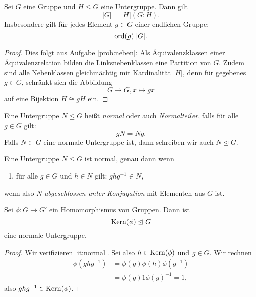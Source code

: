 \documentclass{book}
\begin{document}
\begin{cor}
    \label{cor:lagrange} Sei $G$ eine Gruppe und $H \le G$ eine Untergruppe. Dann gilt
    \[
        |G| = |H| (G:H).
    \]
    Insbesondere gilt für jedes Element $g \in G$ einer endlichen Gruppe: 
    \[
        \operatorname{ord}(g) | |G|.
    \]
\end{cor}
\begin{proof}
    Dies folgt aus Aufgabe \ref{prob:neben}: Als Äquivalenzklassen einer
    Äquivalenzrelation bilden die Linksnebenklassen eine Partition von $G$.
    Zudem sind alle Nebenklassen gleichmächtig mit Kardinalität $|H|$, denn für
    gegebenes $g \in G$, schränkt sich die Abbildung
    \[
        G \to G, x \mapsto gx
    \]
    auf eine Bijektion $H \cong gH$ ein. 
\end{proof}

\begin{defi}
    \label{defi:normal}
    Eine Untergruppe $N \le G$ heißt \emph{normal} oder auch \emph{Normalteiler}, falls für alle $g \in G$ gilt:
    \[
        gN = Ng.
    \]
    Falls $N \subset G$ eine normale Untergruppe ist, dann schreiben wir auch $N \trianglelefteq G$. 
\end{defi}

\begin{rem}
    \label{rem:normal}
    Eine Untergruppe $N \le G$ ist normal, genau dann wenn
    \begin{enumerate}[label=(N\arabic*),leftmargin=1.2cm]
        \item\label{it:normal} für alle $g \in G$ und $h \in N$ gilt: $ghg^{-1} \in N$, 
    \end{enumerate}
    wenn also $N$ \emph{abgeschlossen unter Konjugation} mit Elementen aus $G$ ist.  
\end{rem}

\begin{prop}
    \label{prop:kernnormal}
    Sei $\phi: G \to G'$ ein Homomorphismus von Gruppen. Dann ist 
    \[
        \Kern(\phi) \no G
    \]
    eine normale Untergruppe. 
\end{prop}
\begin{proof}
    Wir verifizieren \ref{it:normal}. Sei also $h \in \Kern(\phi)$ und $g \in G$. Wir rechnen
    \begin{align*}
        \phi(g h g^{-1}) & = \phi(g) \phi(h) \phi(g^{-1})\\
                         & = \phi(g) 1 \phi(g)^{-1} = 1,
    \end{align*}
    also $g h g^{-1} \in \Kern(\phi)$. 
\end{proof}
\end{document}
